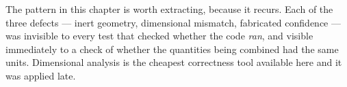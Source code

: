 \begin{hon}\Hon
The pattern in this chapter is worth extracting, because it recurs. Each
of the three defects --- inert geometry, dimensional mismatch,
fabricated confidence --- was invisible to every test that checked
whether the code \emph{ran}, and visible immediately to a check of
whether the quantities being combined had the same units. Dimensional
analysis is the cheapest correctness tool available here and it was
applied late.
\end{hon}
